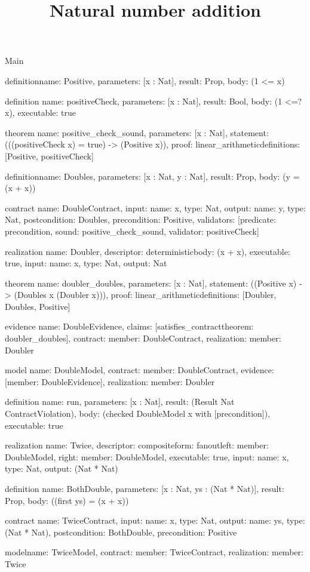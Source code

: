 \begin{lexlean}{Main}
\title{Natural number addition}
\begin{semanticmodule}
definition{name: Positive, parameters: [x : Nat], result: Prop, body: (1 <= x)}

definition{
  name: positiveCheck,
  parameters: [x : Nat],
  result: Bool,
  body: (1 <=? x),
  executable: true
}

theorem{
  name: positive_check_sound,
  parameters: [x : Nat],
  statement: (((positiveCheck x) = true) -> (Positive x)),
  proof: linear_arithmetic{definitions: [Positive, positiveCheck]}
}

definition{name: Doubles, parameters: [x : Nat, y : Nat], result: Prop, body: (y = (x + x))}

contract{
  name: DoubleContract,
  input: {name: x, type: Nat},
  output: {name: y, type: Nat},
  postcondition: Doubles,
  precondition: Positive,
  validators: [{predicate: precondition, sound: positive_check_sound, validator: positiveCheck}]
}

realization{
  name: Doubler,
  descriptor: deterministic{body: (x + x)},
  executable: true,
  input: {name: x, type: Nat},
  output: Nat
}

theorem{
  name: doubler_doubles,
  parameters: [x : Nat],
  statement: ((Positive x) -> (Doubles x (Doubler x))),
  proof: linear_arithmetic{definitions: [Doubler, Doubles, Positive]}
}

evidence{
  name: DoubleEvidence,
  claims: [satisfies_contract{theorem: doubler_doubles}],
  contract: {member: DoubleContract},
  realization: {member: Doubler}
}

model{
  name: DoubleModel,
  contract: {member: DoubleContract},
  evidence: [{member: DoubleEvidence}],
  realization: {member: Doubler}
}

definition{
  name: run,
  parameters: [x : Nat],
  result: (Result Nat ContractViolation),
  body: (checked DoubleModel x with [precondition]),
  executable: true
}

realization{
  name: Twice,
  descriptor: composite{form: fanout{left: {member: DoubleModel}, right: {member: DoubleModel}}},
  executable: true,
  input: {name: x, type: Nat},
  output: (Nat * Nat)
}

definition{
  name: BothDouble,
  parameters: [x : Nat, ys : (Nat * Nat)],
  result: Prop,
  body: ((first ys) = (x + x))
}

contract{
  name: TwiceContract,
  input: {name: x, type: Nat},
  output: {name: ys, type: (Nat * Nat)},
  postcondition: BothDouble,
  precondition: Positive
}

model{name: TwiceModel, contract: {member: TwiceContract}, realization: {member: Twice}}
\end{semanticmodule}
\end{lexlean}
